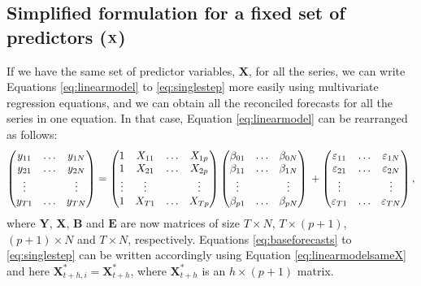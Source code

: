 \documentclass[11pt,a4paper,]{article}
\begin{document}
\hypertarget{simplified-formulation-for-a-fixed-set-of-predictors-bf-x}{%
\subsection{\texorpdfstring{Simplified formulation for a fixed set of predictors (\(\bf {X}\)) \label{sec:proposedapproach2}}{Simplified formulation for a fixed set of predictors (\textbackslash bf \{X\}) }}\label{simplified-formulation-for-a-fixed-set-of-predictors-bf-x}}

If we have the same set of predictor variables, \(\bm{X}\), for all the series, we can write Equations \eqref{eq:linearmodel} to \eqref{eq:singlestep} more easily using multivariate regression equations, and we can obtain all the reconciled forecasts for all the series in one equation. In that case, Equation \eqref{eq:linearmodel} can be rearranged as follows:
\begin{equation}\label{eq:linearmodelsameX}
  \begin{pmatrix}
  y_{11} & \dots & y_{1N}\\
  y_{21} & \dots & y_{2N}\\
  \vdots &       & \vdots\\
  y_{T1} & \dots & y_{TN}
  \end{pmatrix} =
  \begin{pmatrix}
  1      & X_{11} & \dots & X_{1p}\\
  1      & X_{21} & \dots & X_{2p}\\
  \vdots & \vdots &       & \vdots\\
  1      & X_{T1} & \dots & X_{Tp}
  \end{pmatrix}
  \begin{pmatrix}
  \beta_{01} & \dots & \beta_{0N}\\
  \beta_{11} & \dots & \beta_{1N}\\
  \vdots     &       & \vdots\\
  \beta_{p1} & \dots & \beta_{pN}
  \end{pmatrix} \\
  +
  \begin{pmatrix}
  \varepsilon_{11} & \dots & \varepsilon_{1N}\\
  \varepsilon_{21} & \dots & \varepsilon_{2N}\\
  \vdots           &       & \vdots\\
  \varepsilon_{T1} & \dots & \varepsilon_{TN}
  \end{pmatrix},
\end{equation}
where \(\bm{Y}\), \(\bm{X}\), \(\bm{B}\) and \(\bm{E}\) are now matrices of size \(T\times N\), \(T\times (p+1)\), \((p+1)\times N\) and \(T \times N\), respectively. Equations \eqref{eq:baseforecasts} to \eqref{eq:singlestep} can be written accordingly using Equation \eqref{eq:linearmodelsameX} and here \(\bm{X}^*_{t+h,i} = \bm{X}^*_{t+h}\), where \(\bm{X}^*_{t+h}\) is an \(h\times (p+1)\) matrix.
\end{document}
